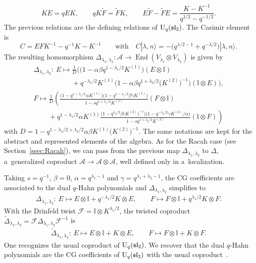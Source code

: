 \documentclass[pdftex]{sigma}
\numberwithin{equation}{section}
\theoremstyle{definition}
\begin{document}
\[
 KE=qEK, \qquad qK\widetilde{F}=\widetilde{F}K, \qquad E\widetilde{F}-\widetilde{F}E=\frac{K-K^{-1}}{q^{1/2}-q^{-1/2}}.
\]
The previous relations are the defining relations of ${\rm U}_q(\mathfrak{sl}_2)$.
The Casimir element is
\[
 C=EFK^{-1}-q^{-1}K-K^{-1} \qquad \text{with} \quad C|\lambda,n\rangle=-\bigl(q^{\lambda/2-1}+q^{-\lambda/2}\bigr)|\lambda,n\rangle.
\]
The resulting homomorphism $\Delta_{\lambda_1,\lambda_2}\colon \mathcal{A} \to \operatorname{End}(V_{\lambda_1}\otimes V_{\lambda_2})$ is given by
\begin{gather*}
 \Delta_{\lambda_1,\lambda_2}\colon\ E\mapsto \frac{1}{D}\bigl(\bigl(1-\alpha\beta q^{1-\lambda_1/2}K^{(1)}\bigr)(E\otimes \mathbb{I})\\
 \phantom{ \Delta_{\lambda_1,\lambda_2}\colon\ E\mapsto }{}+q^{-\lambda_1/2}K^{(1)}\bigl(1-\alpha\beta q^{1+\lambda_2/2} \bigl(K^{(2)}\bigr)^{-1}\bigr)(\mathbb{I}\otimes E)\bigr),\\
 F\mapsto\frac{1}{D}\left(\frac{\bigl(1-q^{1-\lambda_1/2}\alpha K^{(1)}\bigr)\bigl(1-q^{1-\lambda_1/2}\beta\gamma K^{(1)}\bigr)}{1-sq^{1+\lambda_1/2} K^{(1)}}(F\otimes \mathbb{I})\right.\\
\left.\phantom{F\mapsto}{}+q^{1-\lambda_1/2}\alpha K^{(1)}
 \frac{\bigl(1-q^{\lambda_2/2}\beta \bigl(K^{(2)}\bigr)^{-1}\bigr)\bigl(1- q^{-\lambda_2/2}\gamma K^{(2)}/\alpha\bigr)}{1-sq^{1+\lambda_2/2} K^{(2)}}(\mathbb{I}\otimes F)\right)
\end{gather*}
with $D=1-q^{1-\lambda_1/2+\lambda_2/2}\alpha\beta K^{(1)}\bigl(K^{(2)}\bigr)^{-1}$.
The same notations are kept for the abstract and represented elements of the algebra. As for the Racah case (see Section~\ref{ssec:Racah}), we can pass from the previous map $\Delta_{\lambda_1,\lambda_2}$ to $\Delta$, a~generalized coproduct $\mathcal{A}\to \mathcal{A}\otimes\mathcal{A}$, well defined only in a~localization.

Taking $s=q^{-1}$, $\beta=0$, $\alpha=q^{\lambda_1-1}$ and $\gamma=q^{\lambda_1+\lambda_2-1}$, the CG coefficients are associated to the dual $q$-Hahn polynomials and $\Delta_{\lambda_1,\lambda_2}$ simplifies to
\begin{gather*}
 \Delta_{\lambda_1,\lambda_2}\colon\ E\mapsto E\otimes \mathbb{I} +q^{-\lambda_1/2} K\otimes E,\qquad
  F\mapsto F\otimes \mathbb{I} +q^{\lambda_1/2} K\otimes F.
\end{gather*}
With the Drinfeld twist $\mathscr{F}=\mathbb{I} \otimes K^{\lambda_1/2}$, the twisted coproduct $\widetilde{\Delta}_{\lambda_1,\lambda_2}=\mathscr{F}\Delta_{\lambda_1,\lambda_2} \mathscr{F}^{-1}$ is
\begin{gather*}
 \widetilde{\Delta}_{\lambda_1,\lambda_2}\colon\ E\mapsto E\otimes \mathbb{I} + K\otimes E,\qquad
  F\mapsto F\otimes \mathbb{I} + K\otimes F.
\end{gather*}
One recognizes the usual coproduct of ${\rm U}_q(\mathfrak{sl}_2)$. We recover that the dual $q$-Hahn polynomials are the CG coefficients of ${\rm U}_q(\mathfrak{sl}_2)$ with the usual coproduct~\cite{Arv}.
\end{document}

